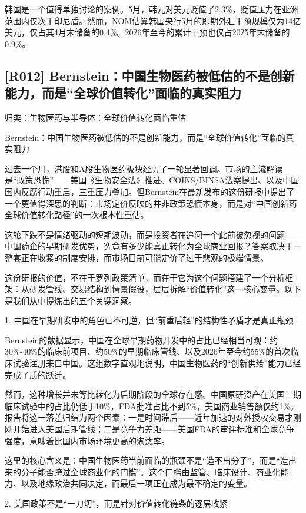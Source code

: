 \documentclass[11pt]{ctexart}
\begin{document}
韩国是一个值得单独讨论的案例。5月，韩元对美元贬值了2.3\%，贬值压力在亚洲范围内仅次于印尼盾。然而，NOM估算韩国央行5月的即期外汇干预规模仅为14亿美元，仅占其4月末储备的0.4\%。2026年至今的累计干预也仅占2025年末储备的0.9\%。

\subsection{[R012] Bernstein：中国生物医药被低估的不是创新能力，而是“全球价值转化”面临的真实阻力}
{\small\color{refgray}归类：生物医药与半导体：全球价值转化面临重估}

Bernstein：中国生物医药被低估的不是创新能力，而是“全球价值转化”面临的真实阻力

过去一个月，港股和A股生物医药板块经历了一轮显著回调。市场的主流解读是“政策恐慌”——美国《生物安全法》推进、COINS/BINSA法案提出、以及中国国内反腐行动重启，三重压力叠加。但Bernstein在最新发布的这份研报中提出了一个更值得深思的判断：市场定价反映的并非政策恐慌本身，而是对“中国创新药全球价值转化路径”的一次根本性重估。

这轮下跌不是情绪驱动的短期波动，而是投资者在追问一个此前被忽视的问题——中国药企的早期研发优势，究竟有多少能真正转化为全球商业回报？答案取决于一整套正在收紧的制度安排，而市场目前可能定价了过于悲观的极端情景。

这份研报的价值，不在于罗列政策清单，而在于它为这个问题搭建了一个分析框架：从研发管线、交易结构到情景假设，层层拆解“价值转化”这一核心变量。以下是我们从中提炼出的五个关键洞察。

1. 中国在早期研发中的角色已不可逆，但“前重后轻”的结构性矛盾才是真正瓶颈

Bernstein的数据显示，中国在全球早期药物开发中的占比已经相当可观：约30\%-40\%的临床前项目、约50\%的早期临床管线、以及2026年至今约55\%的首次临床试验注册来自中国。这组数字直观地说明，中国生物医药的“创新供给”能力已经完成了质的跃迁。

然而，这种增长并未等比转化为后期阶段的全球存在感。中国原研资产在美国三期临床试验中的占比仍低于10\%，FDA批准占比不到5\%，美国商业销售额仅约1\%。报告将这一落差归结为两个因素：一是时间滞后——近年加速的对外授权交易才刚刚开始进入美国后期管线；二是竞争力差距——美国FDA的审评标准和全球竞争强度，意味着比国内市场环境更高的淘汰率。

这里的核心含义是：中国生物医药当前面临的瓶颈不是“造不出分子”，而是“造出来的分子能否跨过全球商业化的门槛”。这个门槛由监管、临床设计、商业化能力、以及地缘政治共同决定，而最后一项正在成为最不确定的变量。

2. 美国政策不是“一刀切”，而是针对价值转化链条的逐层收紧
\end{document}
